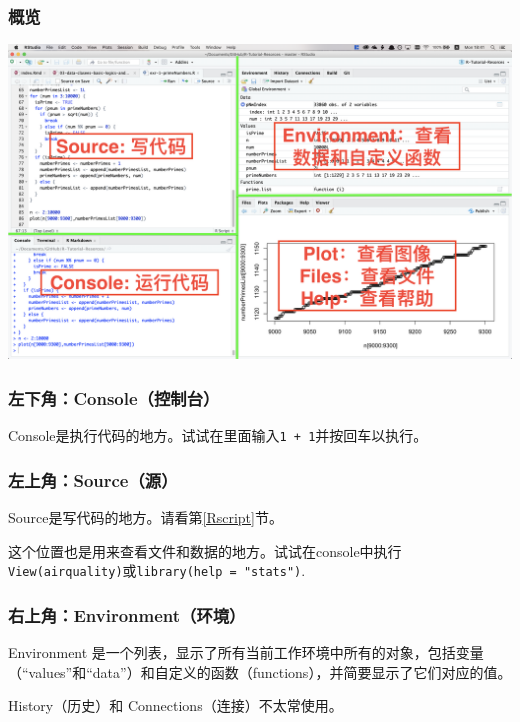 \documentclass[]{book}
\begin{document}
\hypertarget{interface-overview}{%
\subsubsection{概览}\label{interface-overview}}

\includegraphics[width=1\linewidth]{img/01-interface}

\hypertarget{console}{%
\subsubsection{左下角：Console（控制台）}\label{console}}

Console是执行代码的地方。试试在里面输入\texttt{1\ +\ 1}并按回车以执行。

\hypertarget{source}{%
\subsubsection{左上角：Source（源）}\label{source}}

Source是写代码的地方。请看第\ref{Rscript}节。

这个位置也是用来查看文件和数据的地方。试试在console中执行\texttt{View(airquality)}或\texttt{library(help\ =\ "stats")}.

\hypertarget{environment}{%
\subsubsection{右上角：Environment（环境）}\label{environment}}

Environment 是一个列表，显示了所有当前工作环境中所有的对象，包括变量（``values''和``data''）和自定义的函数（functions），并简要显示了它们对应的值。

History（历史）和 Connections（连接）不太常使用。
\end{document}
